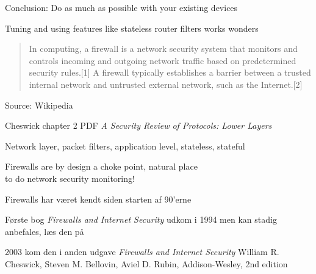 \documentclass[Screen16to9,17pt]{foils}
\begin{document}


\begin{list1}
\item Conclusion: Do as much as possible with your existing devices
\item Tuning and using features like stateless router filters works wonders
\end{list1}



\begin{quote}
In computing, a firewall is a network security system that monitors and controls incoming and outgoing network traffic based on predetermined security rules.[1] A firewall typically establishes a barrier between a trusted internal network and untrusted external network, such as the Internet.[2]
\end{quote} Source: Wikipedia

\begin{list1}
\item {}
\item {} Cheswick chapter 2 PDF
\emph{A Security Review of Protocols:
Lower Layers}
\begin{list2}
\item Network layer, packet filters, application level, stateless, stateful
\end{list2}
\end{list1}

{\Large Firewalls are by design a choke point, natural place \\
to do network security monitoring!}




\begin{list1}
\item Firewalls har været kendt siden starten af 90'erne
\item Første bog \emph{Firewalls and Internet Security} udkom i 1994 men kan stadig anbefales, læs den på 

\item 2003 kom den i anden udgave \emph{Firewalls and Internet Security}
William R. Cheswick, Steven M. Bellovin, Aviel D. Rubin,
Addison-Wesley, 2nd edition
\end{list1}
\end{document}
